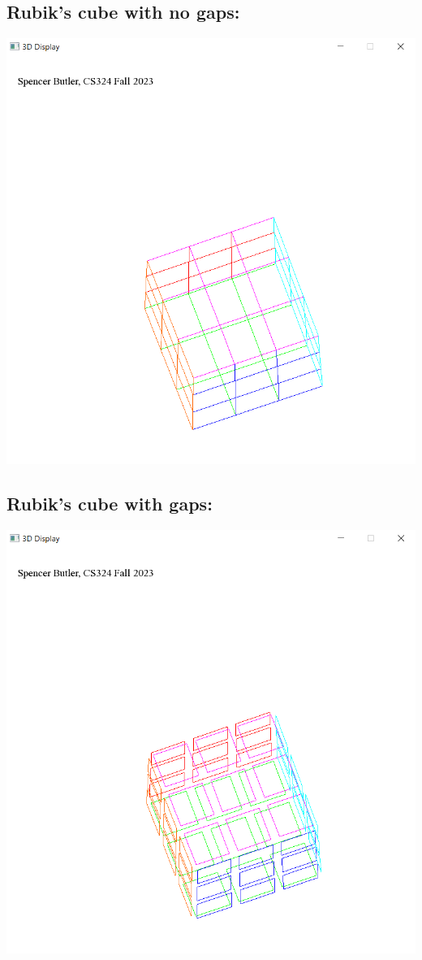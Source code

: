 \documentclass[12pt]{article}
\begin{document}
\subsection{Rubik's cube with no gaps:}
\noindent \includegraphics{img/1}
\subsection{Rubik's cube with gaps:}
\noindent \includegraphics{img/2}
\end{document}
